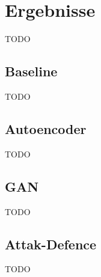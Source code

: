 \chapter{Ergebnisse}
\label{sec:Ergebnisse}
TODO

\section{Baseline}
TODO


\section{Autoencoder}
TODO
\section{GAN}
TODO
\section{Attak-Defence}
TODO